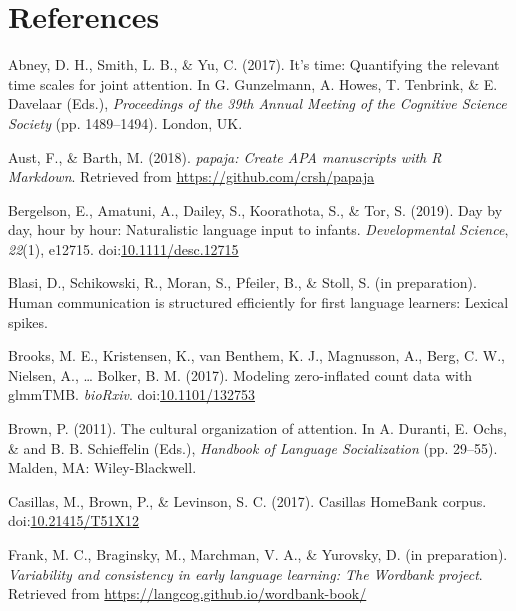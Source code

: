 \documentclass[,man,floatsintext]{apa6}
\begin{document}
\newpage

\section{References}\label{refs}

\begingroup
\setlength{\parindent}{-0.5in} \setlength{\leftskip}{0.5in}

\hypertarget{refs}{}
\hypertarget{ref-abney2017time}{}
Abney, D. H., Smith, L. B., \& Yu, C. (2017). It's time: Quantifying the
relevant time scales for joint attention. In G. Gunzelmann, A. Howes, T.
Tenbrink, \& E. Davelaar (Eds.), \emph{Proceedings of the 39th Annual
Meeting of the Cognitive Science Society} (pp. 1489--1494). London, UK.

\hypertarget{ref-R-papaja}{}
Aust, F., \& Barth, M. (2018). \emph{papaja: Create APA manuscripts with
R Markdown}. Retrieved from \url{https://github.com/crsh/papaja}

\hypertarget{ref-bergelson2019day}{}
Bergelson, E., Amatuni, A., Dailey, S., Koorathota, S., \& Tor, S.
(2019). Day by day, hour by hour: Naturalistic language input to
infants. \emph{Developmental Science}, \emph{22}(1), e12715.
doi:\href{https://doi.org/10.1111/desc.12715}{10.1111/desc.12715}

\hypertarget{ref-blasiIPhuman}{}
Blasi, D., Schikowski, R., Moran, S., Pfeiler, B., \& Stoll, S. (in
preparation). Human communication is structured efficiently for first
language learners: Lexical spikes.

\hypertarget{ref-brooks2017modeling}{}
Brooks, M. E., Kristensen, K., van Benthem, K. J., Magnusson, A., Berg,
C. W., Nielsen, A., \ldots{} Bolker, B. M. (2017). Modeling
zero-inflated count data with glmmTMB. \emph{bioRxiv}.
doi:\href{https://doi.org/10.1101/132753}{10.1101/132753}

\hypertarget{ref-brown2011cultural}{}
Brown, P. (2011). The cultural organization of attention. In A. Duranti,
E. Ochs, \& and B. B. Schieffelin (Eds.), \emph{Handbook of Language
Socialization} (pp. 29--55). Malden, MA: Wiley-Blackwell.

\hypertarget{ref-Casillas-HB}{}
Casillas, M., Brown, P., \& Levinson, S. C. (2017). Casillas HomeBank
corpus. doi:\href{https://doi.org/10.21415/T51X12}{10.21415/T51X12}

\hypertarget{ref-frankIPvariability}{}
Frank, M. C., Braginsky, M., Marchman, V. A., \& Yurovsky, D. (in
preparation). \emph{Variability and consistency in early language
learning: The Wordbank project}. Retrieved from
\url{https://langcog.github.io/wordbank-book/}
\end{document}
